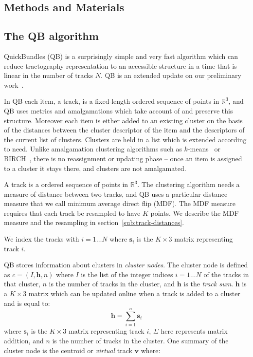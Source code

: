\documentclass{bioinfo}
\begin{document}
\begin{methods}

\section{Methods and Materials}

\subsection{The QB algorithm\label{sub:QB-description}}

QuickBundles (QB) is a surprisingly simple and very fast algorithm which
can reduce tractography representation to an accessible structure in a
time that is linear in the number of tracks $N$. QB is an extended
update on our preliminary work~\cite{EGMB10}.

In QB each item, a track, is a fixed-length ordered sequence of points
in $\mathbb{R}^{3}$, and QB uses metrics and amalgamations which take
account of and preserve this structure.  Moreover each item is either
added to an existing cluster on the basis of the distances between the
cluster descriptor of the item and the descriptors of the current list of
clusters. Clusters are held in a list which is extended according to
need. Unlike amalgamation clustering algorithms such as
$k$-means~\cite{steinhaus1956division, macqueen1967some} or
BIRCH~\cite{zhang1997birch}, there is no reassignment or updating phase
-- once an item is assigned to a cluster it stays there, and clusters
are not amalgamated.

A track is a ordered sequence of points in $\mathbb{R}^{3}$.  The
clustering algorithm needs a measure of distance between two tracks, and
QB uses a particular distance measure that we call minimum average
direct flip (MDF).  The MDF measure requires that each track be
resampled to have $K$ points. We describe the MDF measure and the
resampling in section~\ref{sub:track-distances}.

We index the tracks with $i = 1 \dots N$ where $\mathbf{s}_{i}$ is the
$K\times3$ matrix representing track $i$.

QB stores information about clusters in \emph{cluster nodes}.  The
cluster node is defined as $c=(I,\mathbf{h},n)$ where $I$ is the list of
the integer indices $i = 1 \dots N$ of the tracks in that cluster, $n$
is the number of tracks in the cluster, and $\mathbf{h}$ is the \emph{track
  sum}. $\mathbf{h}$ is a $K \times3$ matrix which can be updated online
when a track is added to a cluster and is equal to:
\begin{equation}
  \mathbf{h}=\sum_{i=1}^{n}\mathbf{s}_{i}
\end{equation} 
where $\mathbf{s}_{i}$ is the $K\times3$ matrix representing track $i$,
$\Sigma$ here represents matrix addition, and $n$ is the number of
tracks in the cluster. One summary of the cluster node is the centroid or
\emph{virtual} track $\mathbf{v}$ where:


\end{methods}
\end{document}
